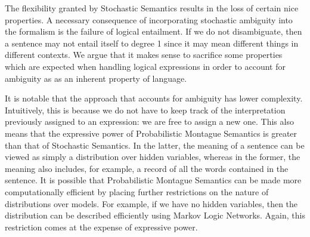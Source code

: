 \documentclass[manuscript]{clv2}
\begin{document}

The flexibility granted by Stochastic Semantics results in the loss of certain nice properties. 
%
%
%
A necessary consequence of incorporating stochastic ambiguity into the formalism is the failure of logical entailment.
If we do not disambiguate, then a sentence may not entail itself to degree 1 since it may mean different things in different contexts. We argue that it makes sense to sacrifice some properties which are expected when handling logical expressions in order to account for ambiguity as as an inherent property of language.

It is notable that the approach that accounts for ambiguity has lower
complexity.
Intuitively, this is because we
do not have to keep track of the interpretation previously assigned to
an expression: we are free to assign a new one. This also means that the expressive power of Probabilistic Montague
Semantics is greater than that of Stochastic Semantics. In the latter, the
meaning of a sentence can be viewed as simply a distribution over
hidden variables, whereas in the former, the meaning also
includes, for example, a record of all the words contained in the
sentence.
It is possible that Probabilistic Montague Semantics can be made more
computationally efficient by placing further restrictions on the
nature of distributions over models. For example, if we have no hidden
variables, then the distribution
can be described efficiently using Markov Logic Networks. Again, this
restriction comes at the expense of expressive power.

\end{document}
